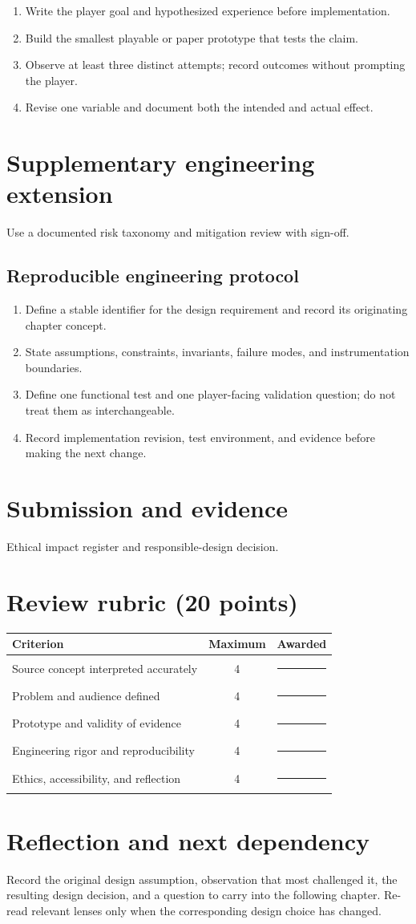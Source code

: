 \documentclass[11pt]{article}
\begin{document}
\begin{enumerate}
\item Write the player goal and hypothesized experience before implementation.
\item Build the smallest playable or paper prototype that tests the claim.
\item Observe at least three distinct attempts; record outcomes without prompting the player.
\item Revise one variable and document both the intended and actual effect.
\end{enumerate}

\section{Supplementary engineering extension}
Use a documented risk taxonomy and mitigation review with sign-off.


\subsection{Reproducible engineering protocol}
\begin{enumerate}
\item Define a stable identifier for the design requirement and record its originating chapter concept.
\item State assumptions, constraints, invariants, failure modes, and instrumentation boundaries.
\item Define one functional test and one player-facing validation question; do not treat them as interchangeable.
\item Record implementation revision, test environment, and evidence before making the next change.
\end{enumerate}

\section{Submission and evidence}
Ethical impact register and responsible-design decision.


\section{Review rubric (20 points)}
\begin{tabularx}{\linewidth}{@{}Xcc@{}}\toprule
Criterion & Maximum & Awarded \\ \midrule
Source concept interpreted accurately & 4 & \rule{0.45in}{0.4pt}\\
Problem and audience defined & 4 & \rule{0.45in}{0.4pt}\\
Prototype and validity of evidence & 4 & \rule{0.45in}{0.4pt}\\
Engineering rigor and reproducibility & 4 & \rule{0.45in}{0.4pt}\\
Ethics, accessibility, and reflection & 4 & \rule{0.45in}{0.4pt}\\\bottomrule
\end{tabularx}

\section{Reflection and next dependency}
Record the original design assumption, observation that most challenged it, the resulting design decision, and a question to carry into the following chapter. Re-read relevant lenses only when the corresponding design choice has changed.
\end{document}
